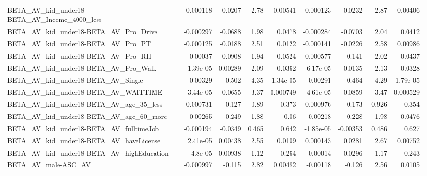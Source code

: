 \begin{tabular}{lrrrrrrrr}
BETA\_AV\_kid\_under18-BETA\_AV\_Income\_4000\_less       &   -0.000118 &      -0.0207 &      2.78 &  0.00541 &  -0.000123 &     -0.0232 &         2.87 &       0.00406 \\
BETA\_AV\_kid\_under18-BETA\_AV\_Pro\_Drive              &   -0.000297 &      -0.0688 &      1.98 &   0.0478 &  -0.000284 &     -0.0703 &         2.04 &        0.0412 \\
BETA\_AV\_kid\_under18-BETA\_AV\_Pro\_PT                 &   -0.000125 &      -0.0188 &      2.51 &   0.0122 &  -0.000141 &     -0.0226 &         2.58 &       0.00986 \\
BETA\_AV\_kid\_under18-BETA\_AV\_Pro\_RH                 &     0.00037 &       0.0908 &     -1.94 &   0.0524 &   0.000577 &       0.141 &        -2.02 &        0.0437 \\
BETA\_AV\_kid\_under18-BETA\_AV\_Pro\_Walk               &    1.39e-05 &      0.00289 &      2.09 &   0.0362 &  -6.17e-05 &     -0.0135 &         2.13 &        0.0328 \\
BETA\_AV\_kid\_under18-BETA\_AV\_Single                 &     0.00329 &        0.502 &      4.35 & 1.34e-05 &    0.00291 &       0.464 &         4.29 &      1.79e-05 \\
BETA\_AV\_kid\_under18-BETA\_AV\_WAITTIME               &   -3.44e-05 &      -0.0655 &      3.37 & 0.000749 &  -4.61e-05 &     -0.0859 &         3.47 &      0.000529 \\
BETA\_AV\_kid\_under18-BETA\_AV\_age\_35\_less            &    0.000731 &        0.127 &     -0.89 &    0.373 &   0.000976 &       0.173 &       -0.926 &         0.354 \\
BETA\_AV\_kid\_under18-BETA\_AV\_age\_60\_more            &     0.00265 &        0.249 &      1.88 &     0.06 &    0.00218 &       0.228 &         1.98 &        0.0476 \\
BETA\_AV\_kid\_under18-BETA\_AV\_fulltimeJob            &   -0.000194 &      -0.0349 &     0.465 &    0.642 &  -1.85e-05 &    -0.00353 &        0.486 &         0.627 \\
BETA\_AV\_kid\_under18-BETA\_AV\_haveLicense            &    2.41e-05 &      0.00438 &      2.55 &   0.0109 &   0.000143 &      0.0281 &         2.67 &       0.00752 \\
BETA\_AV\_kid\_under18-BETA\_AV\_highEducation          &     4.8e-05 &      0.00938 &      1.12 &    0.264 &    0.00014 &      0.0296 &         1.17 &         0.243 \\
BETA\_AV\_male-ASC\_AV                                &   -0.000997 &       -0.115 &      2.82 &  0.00482 &   -0.00118 &      -0.126 &         2.56 &        0.0105 \\

\end{tabular}

